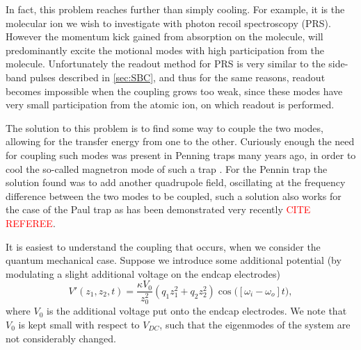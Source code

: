 In fact, this problem reaches further than simply cooling. For example, it is the molecular ion we wish to investigate with photon recoil spectroscopy (PRS). However the momentum kick gained from absorption on the molecule, will predominantly excite the motional modes with high participation from the molecule.
Unfortunately the readout method for PRS is very similar to the side-band pulses described in \cref{sec:SBC}, and thus for the same reasons, readout becomes impossible when the coupling grows too weak, since these modes have very small participation from the atomic ion, on which readout is performed.


The solution to this problem is to find some way to couple the two modes, allowing for the transfer energy from one to the other. Curiously enough the need for coupling such modes was present in Penning traps many years ago, in order to cool the so-called magnetron mode of such a trap \cite{PenningTrap,DehmeltPenningCool}. For the Pennin trap the solution found was to add another quadrupole field, oscillating at the frequency difference between the two modes to be coupled, such a solution also works for the case of the Paul trap as has been demonstrated very recently \textcolor{red}{CITE REFEREE}.

It is easiest to understand the coupling that occurs, when we consider the quantum mechanical case. Suppose we introduce some additional potential (by modulating a slight additional voltage on the endcap electrodes)
\begin{equation}
    V'(z_1,z_2,t) = \frac{\kappa V_0}{z_0^2}(q_1z_1^2+q_2z_2^2)\cos{\big([\omega_i-\omega_o]t\big)},
\end{equation}
where $V_0$ is the additional voltage put onto the endcap electrodes. We note that $V_0$ is kept small with respect to $V_{DC}$, such that the eigenmodes of the system are not considerably changed.

